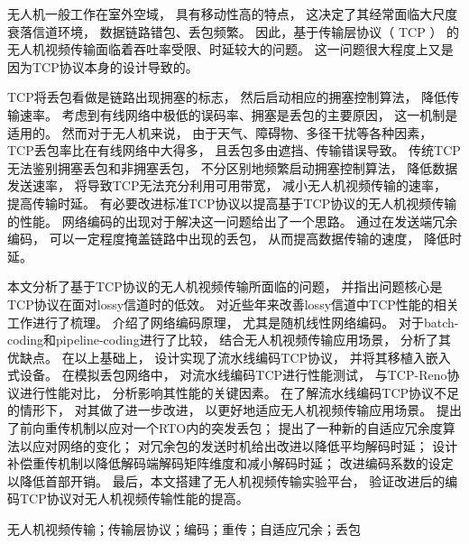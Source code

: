 \cabstract
{
	无人机一般工作在室外空域，
	具有移动性高的特点，
	这决定了其经常面临大尺度衰落信道环境，
	数据链路错包、丢包频繁。
	因此，基于传输层协议（ TCP ） 的无人机视频传输面临着吞吐率受限、时延较大的问题。
	这一问题很大程度上又是因为TCP协议本身的设计导致的。
	\par
	TCP将丢包看做是链路出现拥塞的标志，
	然后启动相应的拥塞控制算法，
	降低传输速率。
	考虑到有线网络中极低的误码率、拥塞是丢包的主要原因，
	这一机制是适用的。
	然而对于无人机来说，
	由于天气、障碍物、多径干扰等各种因素，
	TCP丢包率比在有线网络中大得多，
	且丢包多由遮挡、传输错误导致。
	传统TCP无法鉴别拥塞丢包和非拥塞丢包，
	不分区别地频繁启动拥塞控制算法，
	降低数据发送速率，
	将导致TCP无法充分利用可用带宽，
	减小无人机视频传输的速率，
	提高传输时延。
	有必要改进标准TCP协议以提高基于TCP协议的无人机视频传输的性能。
	网络编码的出现对于解决这一问题给出了一个思路。
	通过在发送端冗余编码，
	可以一定程度掩盖链路中出现的丢包，
	从而提高数据传输的速度，
	降低时延。
	\par
	本文分析了基于TCP协议的无人机视频传输所面临的问题，
	并指出问题核心是TCP协议在面对lossy信道时的低效。
	对近些年来改善lossy信道中TCP性能的相关工作进行了梳理。
	介绍了网络编码原理，
	尤其是随机线性网络编码。
	对于batch-coding和pipeline-coding进行了比较，
	结合无人机视频传输应用场景，
	分析了其优缺点。
	在以上基础上，
	设计实现了流水线编码TCP协议，
	并将其移植入嵌入式设备。
	在模拟丢包网络中，
	对流水线编码TCP进行性能测试，
	与TCP-Reno协议进行性能对比，
	分析影响其性能的关键因素。
	在了解流水线编码TCP协议不足的情形下，
	对其做了进一步改进，
	以更好地适应无人机视频传输应用场景。
	提出了前向重传机制以应对一个RTO内的突发丢包；
	提出了一种新的自适应冗余度算法以应对网络的变化；
	对冗余包的发送时机给出改进以降低平均解码时延；
	设计补偿重传机制以降低解码端解码矩阵维度和减小解码时延；
	改进编码系数的设定以降低首部开销。
	最后，本文搭建了无人机视频传输实验平台，
	验证改进后的编码TCP协议对无人机视频传输性能的提高。
	\par
	
}
{无人机视频传输；传输层协议；编码；重传；自适应冗余；丢包} 	%